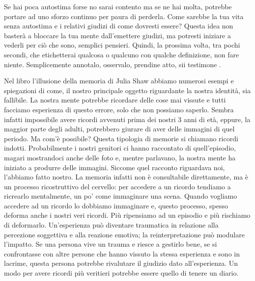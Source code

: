 \documentclass[12pt]{book} %
\begin{document}
Se hai poca autostima forse no sarai contento ma se ne hai molta, potrebbe portare ad uno sforzo continuo per paura di perderla. Come
sarebbe la tua vita senza autostima e i relativi giudizi di come dovresti essere? Questa idea non basterà a bloccare la
tua mente dall'emettere giudizi, ma potresti iniziare a vederli per ciò che sono, semplici pensieri.
Quindi, la prossima volta, tra pochi secondi, che etichetterai qualcosa o qualcuno con qualche definizione, non fare
niente. Semplicemente annotalo, osservalo, prendine atto, sii
testimone
.

\begin{mdframed}[linewidth=1pt]
Nel libro l'illusione della memoria di Julia Shaw abbiamo numerosi esempi
e spiegazioni di come, il nostro principale oggetto riguardante la nostra identità, sia fallibile. La nostra mente
potrebbe ricordare delle cose mai vissute e tutti facciamo esperienza di questo errore, solo che non possiamo saperlo.
Sembra infatti impossibile avere ricordi avvenuti prima dei nostri 3 anni di età, eppure, la maggior parte degli adulti, potrebbero giurare
di aver delle immagini di quel periodo. Ma com'è possibile? Questa tipologia di memorie si
chiamano ricordi indotti. Probabilmente i nostri genitori ci hanno raccontato di quell'episodio,
magari mostrandoci anche delle foto e, mentre parlavano, la nostra mente ha iniziato a produrre delle immagini. Siccome
quel racconto riguardava noi, l'abbiamo fatto nostro. La memoria infatti non è consultabile direttamente, ma è un processo ricostruttivo del cervello: per accedere a un ricordo tendiamo a ricrearlo mentalmente, un po’ come immaginare una scena. Quando vogliamo accedere ad un ricordo lo dobbiamo immaginare e, questo processo, spesso deforma anche i nostri veri ricordi. Più
ripensiamo ad un episodio e più rischiamo di deformarlo. Un’esperienza può diventare traumatica in relazione alla percezione soggettiva e alla reazione emotiva; la reinterpretazione può modulare l’impatto. Se una persona vive un trauma e riesce a gestirlo bene, se si confrontasse con altre persone che hanno
vissuto la stessa esperienza e sono in lacrime, questa persona potrebbe rivalutare il giudizio dato all'esperienza. Un
modo per avere ricordi più veritieri potrebbe essere quello di tenere un diario.


\end{mdframed}
\end{document}
